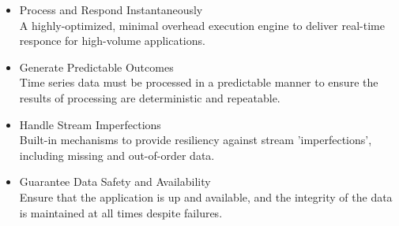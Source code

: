 \begin{itemize}
\item{Process and Respond Instantaneously\\ A highly-optimized, minimal overhead execution engine to deliver real-time responce for 
high-volume applications. }
\item{Generate Predictable Outcomes\\ Time series data must be processed in a predictable manner to ensure the results of processing 
are deterministic and repeatable.} 
\item{Handle Stream Imperfections\\ Built-in mechanisms to provide resiliency against stream 'imperfections', including missing and
out-of-order data.}
\item{Guarantee Data Safety and Availability\\ Ensure that the application is up and available, and the integrity of the data is maintained 
at all times despite failures. }
\end{itemize}

